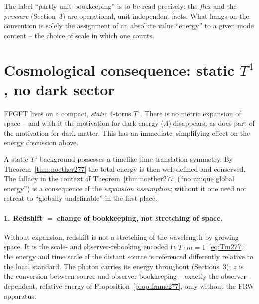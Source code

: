 \begin{remark}
The label \enquote{partly unit-bookkeeping} is to be read precisely: the
\emph{flux} and the \emph{pressure} (Section~3) are operational,
unit-independent facts. What hangs on the convention is solely the assignment
of an absolute value \enquote{energy} to a given mode content -- the choice of
scale in which one counts.
\end{remark}

\section{Cosmological consequence: static $T^4$, no dark sector}
\label{sec:cosmo277}

FFGFT lives on a compact, \emph{static} 4-torus $T^4$. There is no metric
expansion of space -- and with it the motivation for dark energy ($\Lambda$)
disappears, as does part of the motivation for dark matter. This has an
immediate, simplifying effect on the energy discussion above.

\begin{proposition}
\label{prop:global277}
A static $T^4$ background possesses a timelike time-translation symmetry. By
Theorem~\ref{thm:noether277} the total energy is then well-defined and
conserved. The fallacy in the context of Theorem~\ref{thm:noether277}
(\enquote{no unique global energy}) is a consequence of the \emph{expansion
assumption}; without it one need not retreat to \enquote{globally undefinable}
in the first place.
\end{proposition}

\paragraph{1. Redshift $=$ change of bookkeeping, not stretching of space.}
Without expansion, redshift is not a stretching of the wavelength by growing
space. It is the scale- and observer-rebooking encoded in
$\tilde T\cdot m = 1$~\eqref{eq:Tm277}: the energy and time scale of the distant
source is referenced differently relative to the local standard. The photon
carries its energy throughout (Sections~3); $z$ is the conversion between
source and observer bookkeeping -- exactly the observer-dependent, relative
energy of Proposition~\ref{prop:frame277}, only without the FRW apparatus.

